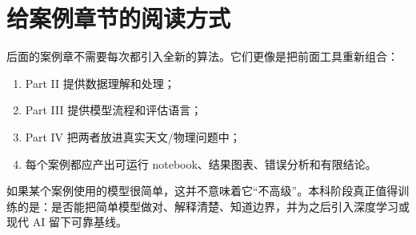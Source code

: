 \section*{给案例章节的阅读方式}

后面的案例章不需要每次都引入全新的算法。它们更像是把前面工具重新组合：

\begin{enumerate}
    \item Part II 提供数据理解和处理；
    \item Part III 提供模型流程和评估语言；
    \item Part IV 把两者放进真实天文/物理问题中；
    \item 每个案例都应产出可运行 notebook、结果图表、错误分析和有限结论。
\end{enumerate}

如果某个案例使用的模型很简单，这并不意味着它“不高级”。本科阶段真正值得训练的是：是否能把简单模型做对、解释清楚、知道边界，并为之后引入深度学习或现代 AI 留下可靠基线。
